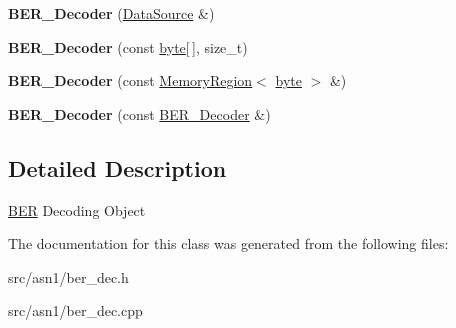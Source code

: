 \begin{DoxyCompactItemize}
\item 
\hypertarget{classBotan_1_1BER__Decoder_ac788f68232a841961dde477e0fabcfc4}{{\bfseries B\-E\-R\-\_\-\-Decoder} (\hyperlink{classBotan_1_1DataSource}{Data\-Source} \&)}\label{classBotan_1_1BER__Decoder_ac788f68232a841961dde477e0fabcfc4}

\item 
\hypertarget{classBotan_1_1BER__Decoder_a6499032b0ad384f1c19dbeb3f5c4ece9}{{\bfseries B\-E\-R\-\_\-\-Decoder} (const \hyperlink{namespaceBotan_a7d793989d801281df48c6b19616b8b84}{byte}\mbox{[}$\,$\mbox{]}, size\-\_\-t)}\label{classBotan_1_1BER__Decoder_a6499032b0ad384f1c19dbeb3f5c4ece9}

\item 
\hypertarget{classBotan_1_1BER__Decoder_a9717e78b67df4fd494e7bea67e584892}{{\bfseries B\-E\-R\-\_\-\-Decoder} (const \hyperlink{classBotan_1_1MemoryRegion}{Memory\-Region}$<$ \hyperlink{namespaceBotan_a7d793989d801281df48c6b19616b8b84}{byte} $>$ \&)}\label{classBotan_1_1BER__Decoder_a9717e78b67df4fd494e7bea67e584892}

\item 
\hypertarget{classBotan_1_1BER__Decoder_af548402cb85e47c86d377ba4be9d993e}{{\bfseries B\-E\-R\-\_\-\-Decoder} (const \hyperlink{classBotan_1_1BER__Decoder}{B\-E\-R\-\_\-\-Decoder} \&)}\label{classBotan_1_1BER__Decoder_af548402cb85e47c86d377ba4be9d993e}

\end{DoxyCompactItemize}


\subsection{Detailed Description}
\hyperlink{namespaceBotan_1_1BER}{B\-E\-R} Decoding Object 

The documentation for this class was generated from the following files\-:\begin{DoxyCompactItemize}
\item 
src/asn1/ber\-\_\-dec.\-h\item 
src/asn1/ber\-\_\-dec.\-cpp\end{DoxyCompactItemize}
